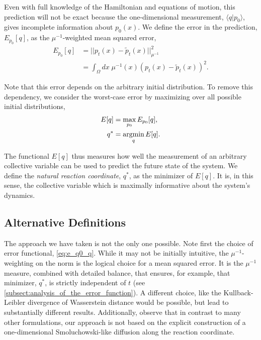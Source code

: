 \documentclass[aip, jcp, reprint, nolinenumbers, twocolumn, nobalancelastpage, nofootinbib]{revtex4-1}
\newcommand{\argmin}{\operatornamewithlimits{argmin}}
\begin{document}
Even with full knowledge of the Hamiltonian and equations of motion, this prediction will not be exact because the one-dimensional measurement, $\langle q | p_0 \rangle$, gives incomplete information about $p_0(x)$. We define the error in the prediction, $E_{p_0}[q]$, as the $\mu^{-1}$-weighted mean squared error,
\begin{align}
E_{p_0}[q] &= ||p_t(x) - \tilde{p}_t(x)||_{\mu^{-1}}^2 \nonumber \\
&= \int_\Omega dx \; \mu^{-1}(x) (p_t(x) - \tilde{p}_t(x))^2. \label{eq:e_q0_q}
\end{align}

Note that this error depends on the arbitrary initial distribution. To remove this dependency, we consider the worst-case error by maximizing over all possible initial distributions,
\begin{align}
E[q] &= \max_{p_0} E_{p_0}[q], \\
q^* &= \argmin_q E[q]. \label{eq:defn}
\end{align}

The functional $E[q]$ thus measures how well the measurement of an arbitrary collective variable can be used to predict the future state of the system. We define the \emph{natural reaction coordinate}, $q^*$, as the minimizer of $E[q]$. It is, in this sense, the collective variable which is maximally informative about the system's dynamics.

\subsection{Alternative Definitions}

The approach we have taken is not the only one possible. Note first the choice of error functional, \cref{eq:e_q0_q}. While it may not be initially intuitive, the $\mu^{-1}$-weighting on the norm is the logical choice for a mean squared error. It is the $\mu^{-1}$ measure, combined with detailed balance, that ensures, for example, that minimizer, $q^*$, is strictly independent of $t$ (see \cref{subsect:analysis_of_the_error_function}). A different choice, like the Kullback-Leibler divergence of Wasserstein distance would be possible,\cite{gibbs2002choosing} but lead to substantially different results. Additionally, observe that in contrast to many other formulations,\cite{berezhkovskii2005one, rhee2005onedimensional, berezhkovskii2013fiffusion} our approach is not based on the explicit construction of a one-dimensional Smoluchowski-like diffusion along the reaction coordinate.
\end{document}
